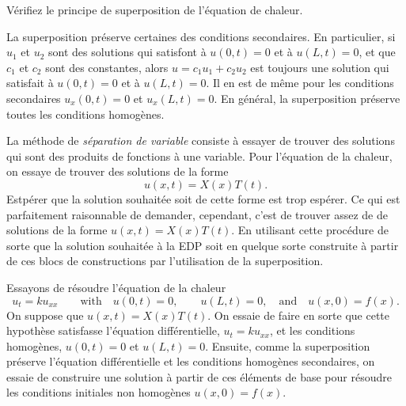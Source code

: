 \begin{exercise}
Vérifiez le principe de superposition de l'équation de chaleur.
\end{exercise}

La superposition préserve certaines des conditions secondaires.  En particulier,
si $ u_1 $ et $ u_2 $ sont des 
solutions qui satisfont à $ u (0, t) = 0 $ et à $ u (L, t) = 0 $,
et que $ c_1 $  et $ c_2 $ sont des constantes,  alors
$ u = c_1 u_1 + c_2 u_2 $ est toujours une solution
qui satisfait à $ u (0, t) = 0 $ et à  $ u (L, t) = 0 $.  Il en est de même
pour les conditions secondaires $ u_x (0, t) = 0 $ et $ u_x (L, t) = 0 $.  En général,
la superposition préserve toutes les conditions homogènes.

La méthode de 
\emph{séparation de variable} consiste à essayer de trouver des solutions qui sont des produits de fonctions à une variable.
Pour l'équation de la chaleur,  on essaye de trouver des solutions de la forme
\begin{equation*}
u(x,t) = X(x)T(t) .
\end{equation*}
Estpérer que la solution souhaitée soit de cette forme est trop
espérer.  Ce qui est parfaitement raisonnable de demander,  cependant,  c'est de trouver
assez de  de solutions de la forme
$u(x,t) = X(x)T(t)$.  En utilisant cette procédure
de sorte que la solution souhaitée à la EDP soit en quelque sorte construite à partir de ces
blocs de constructions par l'utilisation de la superposition. 

Essayons de résoudre l'équation de la chaleur
\begin{equation*}
u_t = k u_{xx}
\qquad \text{with} \quad
u(0,t) = 0 ,\quad \quad u(L,t) = 0,
\quad \text{and} \quad u(x,0) = f(x) .
\end{equation*}
On suppose que $u(x,t) = X(x)T(t)$.  On essaie de faire en sorte que cette hypothèse satisfasse l'équation différentielle, $ u_t = k u_ {xx} $, et les conditions homogènes,
$ u (0, t) = 0 $ et $ u (L, t) = 0 $.  Ensuite,  comme la superposition préserve l'équation différentielle et les conditions homogènes secondaires,  on essaie de
construire une solution à partir de ces éléments de base pour résoudre les
conditions initiales non homogènes $ u (x, 0) = f (x) $.

